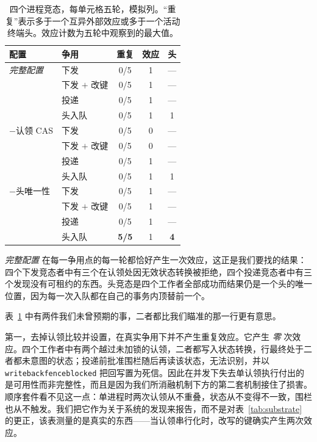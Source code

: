 \documentclass[acmsmall,manuscript,review,anonymous]{acmart}
\renewcommand{\_}{\discretionary{\textunderscore}{}{\textunderscore}}
\begin{document}
\begin{table}[t]
\centering
\small
\caption{四个进程竞态，每单元格五轮，模拟列。“重复”表示多于一个互异外部效应或多于一个活动终端头。效应计数为五轮中观察到的最大值。}
\label{tab:concurrency}
\begin{tabular}{@{}llccc@{}}
\hline
配置 & 争用 & 重复 & 效应 & 头\\
\hline
\emph{完整配置} & 下发          & 0/5 & 1 & ---\\
            & 下发 $+$ 改键& 0/5 & 1 & ---\\
            & 投递          & 0/5 & 1 & ---\\
            & 头入队      & 0/5 & 1 & 1\\
\hline
$-$认领 CAS & 下发          & 0/5 & 0 & ---\\
             & 下发 $+$ 改键& 0/5 & 0 & ---\\
             & 投递          & 0/5 & 1 & ---\\
             & 头入队      & 0/5 & 1 & 1\\
\hline
$-$头唯一性 & 下发        & 0/5 & 1 & ---\\
               & 下发 $+$ 改键& 0/5 & 1 & ---\\
               & 投递        & 0/5 & 1 & ---\\
               & 头入队    & \textbf{5/5} & 1 & \textbf{4}\\
\hline
\end{tabular}
\end{table}

\emph{完整配置} 在每一争用点的每一轮都恰好产生一次效应，这正是我们要找的结果：四个下发竞态者中有三个在认领处因无效状态转换被拒绝，四个投递竞态者中有三个发现没有可租约的东西。头竞态是四个工作者全部成功而结果仍是一个头的唯一位置，因为每一次入队都在自己的事务内顶替前一个。

表~\ref{tab:concurrency} 中有两件我们未曾预期的事，二者都比我们瞄准的那一行更有意思。

第一，去掉认领比较并设置，在真实争用下并不产生重复效应。它产生 \emph{零} 次效应。四个工作者中有两个越过未加锁的认领，二者都写入状态转换，行最终处于二者都未意图的状态；投递前批准围栏随后再读该状态，无法识别，并以 \texttt{writeback\_fence\_blocked} 把回写置为死信。因此在并发下失去单认领执行付出的是可用性而非完整性，而且是因为我们所消融机制下方的第二套机制接住了损害。顺序套件看不见这一点：单进程时两次认领从不重叠，状态从不变得不一致，围栏也从不触发。我们把它作为关于系统的发现来报告，而不是对表~\ref{tab:substrate} 的更正，该表测量的是真实的东西——当认领串行化时，改写的键确实产生两次效应。
\end{document}
